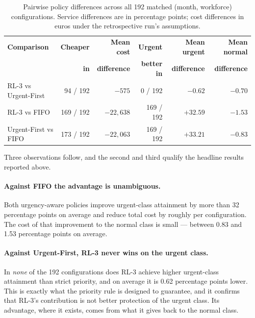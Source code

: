 \begin{table}[htbp]
\centering
\caption[Pairwise policy differences over 192 matched configurations]{Pairwise policy
differences across all 192 matched (month, workforce) configurations. Service differences are
in percentage points; cost differences in euros under the retrospective run's assumptions.}
\label{tab:matched}
\small
\begin{tabular}{lrrrrr}
\toprule
\textbf{Comparison} & \textbf{Cheaper} & \textbf{Mean cost} & \textbf{Urgent} &
\textbf{Mean urgent} & \textbf{Mean normal} \\
 & \textbf{in} & \textbf{difference} & \textbf{better in} & \textbf{difference} &
 \textbf{difference} \\
\midrule
RL-3 vs Urgent-First & 94 / 192  & \(-575\)     & 0 / 192   & \(-0.62\) & \(-0.70\) \\
RL-3 vs FIFO         & 169 / 192 & \(-22{,}638\) & 169 / 192 & \(+32.59\) & \(-1.53\) \\
Urgent-First vs FIFO & 173 / 192 & \(-22{,}063\) & 169 / 192 & \(+33.21\) & \(-0.83\) \\
\bottomrule
\end{tabular}
\end{table}

Three observations follow, and the second and third qualify the headline results reported above.

\paragraph{Against FIFO the advantage is unambiguous.} Both urgency-aware policies improve
urgent-class attainment by more than 32 percentage points on average and reduce total cost by
roughly  per configuration. The cost of that improvement to the normal class is
small --- between \num{0.83} and \num{1.53} percentage points on average.

\paragraph{Against Urgent-First, RL-3 never wins on the urgent class.} In \emph{none} of the
192 configurations does RL-3 achieve higher urgent-class attainment than strict priority, and
on average it is \num{0.62} percentage points lower. This is exactly what the priority rule is
designed to guarantee, and it confirms that RL-3's contribution is not better protection of the
urgent class. Its advantage, where it exists, comes from what it gives back to the normal class.

